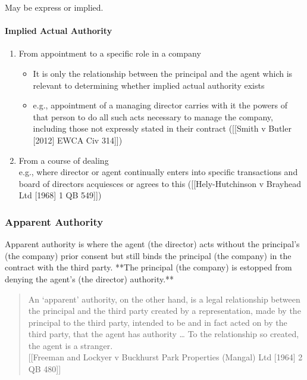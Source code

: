 \documentclass[
]{article}
\newenvironment{Shaded}{}{}
\newcommand{\NormalTok}[1]{#1}
\providecommand{\tightlist}{%
  \setlength{\itemsep}{0pt}\setlength{\parskip}{0pt}}
\begin{document}
May be express or implied.

\hypertarget{implied-actual-authority}{%
\paragraph{Implied Actual Authority}\label{implied-actual-authority}}

\begin{enumerate}
\def\labelenumi{\arabic{enumi}.}
\tightlist
\item
  From appointment to a specific role in a company

  \begin{itemize}
  \tightlist
  \item
    It is only the relationship between the principal and the agent
    which is relevant to determining whether implied actual authority
    exists
  \item
    e.g., appointment of a managing director carries with it the powers
    of that person to do all such acts necessary to manage the company,
    including those not expressly stated in their contract ({[}{[}Smith
    v Butler {[}2012{]} EWCA Civ 314{]}{]})
  \end{itemize}
\item
  From a course of dealing\\
  e.g., where director or agent continually enters into specific
  transactions and board of directors acquiesces or agrees to this
  ({[}{[}Hely-Hutchinson v Brayhead Ltd {[}1968{]} 1 QB 549{]}{]})
\end{enumerate}

\hypertarget{apparent-authority}{%
\subsubsection{Apparent Authority}\label{apparent-authority}}

\begin{Shaded}
\begin{Highlighting}[]
\NormalTok{Apparent authority is where the agent (the director) acts without the principal’s (the company) prior consent but still binds the principal (the company) in the contract with the third party. **The principal (the company) is estopped from denying the agent’s (the director) authority.**}
\end{Highlighting}
\end{Shaded}

\begin{quote}
An `apparent' authority, on the other hand, is a legal relationship
between the principal and the third party created by a representation,
made by the principal to the third party, intended to be and in fact
acted on by the third party, that the agent has authority \ldots{} To
the relationship so created, the agent is a stranger.\\
{[}{[}Freeman and Lockyer v Buckhurst Park Properties (Mangal) Ltd
{[}1964{]} 2 QB 480{]}{]}
\end{quote}
\end{document}
